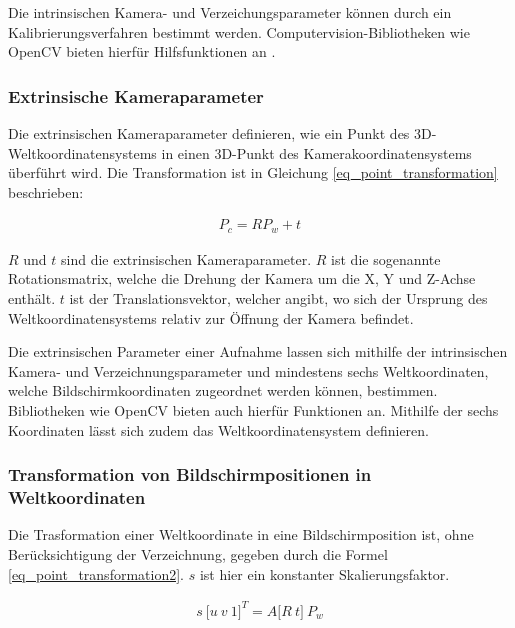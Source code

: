 Die intrinsischen Kamera- und Verzeichungsparameter können durch ein Kalibrierungsverfahren bestimmt werden.
Computervision-Bibliotheken wie OpenCV bieten hierfür Hilfsfunktionen an \cite[]{DevTeamOpenCV2018}.

\subsubsection{Extrinsische Kameraparameter}

Die extrinsischen Kameraparameter definieren, wie ein Punkt des 3D-Weltkoordinatensystems in einen 3D-Punkt
des Kamerakoordinatensystems überführt wird.
Die Transformation ist in Gleichung \ref{eq_point_transformation} beschrieben:

\begin{ceqn}
\begin{align}
\label{eq_point_transformation}
    P_c = R P_w + t
\end{align}
\end{ceqn}

$R$ und $t$ sind die extrinsischen Kameraparameter. $R$ ist die sogenannte Rotationsmatrix, welche
die Drehung der Kamera um die X, Y und Z-Achse enthält. $t$ ist der Translationsvektor,
welcher angibt, wo sich der Ursprung des Weltkoordinatensystems relativ zur Öffnung der Kamera befindet.

Die extrinsischen Parameter einer Aufnahme lassen sich mithilfe der intrinsischen Kamera- und Verzeichnungsparameter
und mindestens sechs Weltkoordinaten, welche Bildschirmkoordinaten zugeordnet werden können, bestimmen. Bibliotheken
wie OpenCV bieten auch hierfür Funktionen an. Mithilfe der sechs Koordinaten lässt sich zudem das Weltkoordinatensystem
definieren.

\subsubsection{Transformation von Bildschirmpositionen in Weltkoordinaten}

Die Trasformation einer Weltkoordinate in eine Bildschirmposition ist, ohne Berücksichtigung der Verzeichnung,
gegeben durch die Formel \ref{eq_point_transformation2}. $s$ ist hier ein konstanter Skalierungsfaktor.

\begin{ceqn}
\begin{align}
\label{eq_point_transformation2}
    s\ \big[u\ v\ 1\big]^T = A \big[R\ t\big]\ P_w
\end{align}
\end{ceqn}

